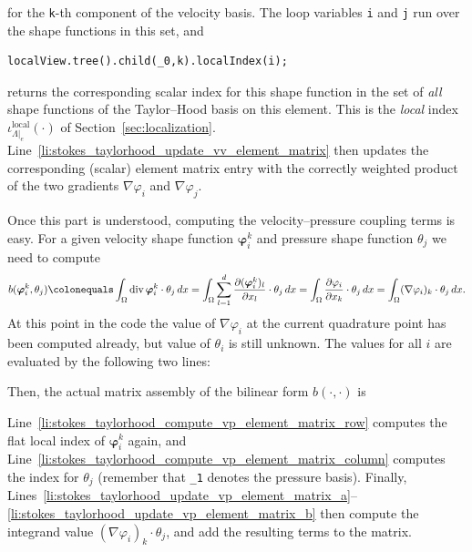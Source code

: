 \documentclass[a4paper,10pt,headings=normal,bibliography=totoc]{scrartcl}
\newcommand{\cpp}[1]{\lstinline[basicstyle=\ttfamily]!#1!}
\begin{document}
for the \cpp{k}-th component of the velocity basis.  The loop variables \cpp{i} and \cpp{j} run over
the shape functions in this set, and
\begin{lstlisting}[style=Example]
localView.tree().child(_0,k).localIndex(i);
\end{lstlisting}
returns the corresponding scalar index for this shape function in the set of \emph{all} shape functions
of the Taylor--Hood basis on this element.  This is the \emph{local} index
$\iota^{\text{local}}_{\Lambda|_e}(\cdot)$ of Section~\ref{sec:localization}.
Line~\ref{li:stokes_taylorhood_update_vv_element_matrix} then updates the corresponding (scalar)
element matrix entry with the correctly weighted product of the two gradients $\nabla \varphi_i$
and $\nabla \varphi_j$.

Once this part is understood, computing the velocity--pressure coupling terms is easy.
For a given velocity shape function $\bm{\varphi}_i^k$ and pressure shape function $\theta_j$ we need
to compute
\begin{equation*}
 b(\bm{\varphi}_i^k,\theta_j)
 \colonequals
 \int_\Omega \operatorname{div} \bm{\varphi}_i^k \cdot \theta_j\,dx
 =
 \int_\Omega \sum_{l=1}^d \frac{\partial (\bm{\varphi}_i^k)_l}{\partial x_l} \cdot \theta_j\,dx
 =
 \int_\Omega \frac{\partial \varphi_i}{\partial x_k} \cdot \theta_j\,dx
 =
 \int_\Omega (\nabla \varphi_i)_k \cdot \theta_j\,dx.
\end{equation*}
At this point in the code the value of $\nabla \varphi_i$ at the current quadrature point
has been computed already, but value of $\theta_i$ is still unknown.
The values for all $i$ are evaluated by the following two lines:
%

%
Then, the actual matrix assembly of the bilinear form $b(\cdot,\cdot)$ is
%

%
Line~\ref{li:stokes_taylorhood_compute_vp_element_matrix_row} computes the
flat local index of $\bm{\varphi}_i^k$ again,
and Line~\ref{li:stokes_taylorhood_compute_vp_element_matrix_column} computes the index for $\theta_j$ (remember that \cpp{_1} denotes
the pressure basis).  Finally, Lines~\ref{li:stokes_taylorhood_update_vp_element_matrix_a}--\ref{li:stokes_taylorhood_update_vp_element_matrix_b}
then compute the integrand value $(\nabla \varphi_i)_k \cdot \theta_j$,
and add the resulting terms to the matrix.







\end{document}

